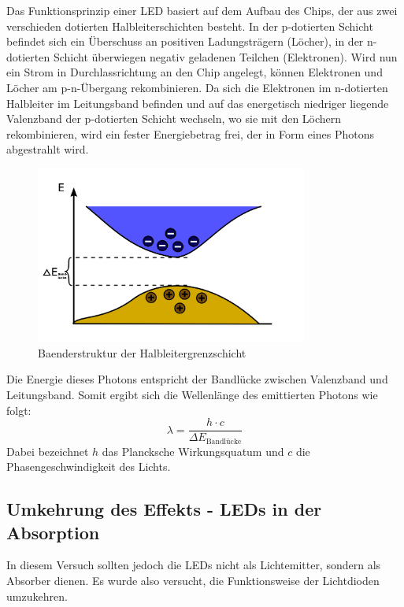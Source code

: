 \documentclass[11pt]{scrartcl}
\begin{document}
Das Funktionsprinzip einer LED basiert auf dem Aufbau des Chips, der aus zwei verschieden dotierten Halbleiterschichten besteht. In der p-dotierten Schicht befindet sich ein Überschuss an positiven Ladungsträgern (Löcher), in der n-dotierten Schicht überwiegen negativ geladenen Teilchen (Elektronen). Wird nun ein Strom in Durchlassrichtung an den Chip angelegt, können Elektronen und Löcher am p-n-Übergang rekombinieren. Da sich die Elektronen im n-dotierten Halbleiter im Leitungsband befinden und auf das energetisch niedriger liegende Valenzband der p-dotierten Schicht wechseln, wo sie mit den Löchern rekombinieren, wird ein fester Energiebetrag frei, der in Form eines Photons abgestrahlt wird.

\begin{figure}[ht]
\begin{center}
\includegraphics[width=0.8\textwidth]{band.jpg}
\end{center}
\vspace{-1.5\baselineskip}
\caption{Baenderstruktur der Halbleitergrenzschicht}
\label{Baendermodell}
\end{figure}

Die Energie dieses Photons entspricht der Bandlücke zwischen Valenzband und Leitungsband. Somit ergibt sich die Wellenlänge des emittierten Photons wie folgt:
 \[ \lambda = \frac{h \cdot c}{\Delta E_{\text{Bandlücke}}} \]
Dabei bezeichnet $h$ das Plancksche Wirkungsquatum und $c$ die Phasengeschwindigkeit des Lichts.

\subsection{Umkehrung des Effekts - LEDs in der Absorption}
In diesem Versuch sollten jedoch die LEDs nicht als Lichtemitter, sondern als Absorber dienen. Es wurde also versucht, die Funktionsweise der Lichtdioden umzukehren.
\end{document}
